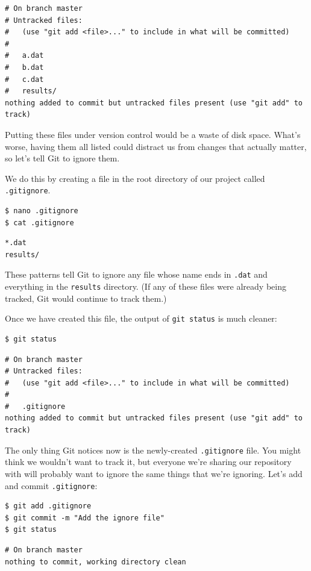 \documentclass{book}
\begin{document}
\begin{verbatim}
# On branch master
# Untracked files:
#   (use "git add <file>..." to include in what will be committed)
#
#   a.dat
#   b.dat
#   c.dat
#   results/
nothing added to commit but untracked files present (use "git add" to track)
\end{verbatim}

Putting these files under version control would be a waste of disk
space. What's worse, having them all listed could distract us from
changes that actually matter, so let's tell Git to ignore them.

We do this by creating a file in the root directory of our project
called \texttt{.gitignore}.

\begin{verbatim}
$ nano .gitignore
$ cat .gitignore
\end{verbatim}

\begin{verbatim}
*.dat
results/
\end{verbatim}

These patterns tell Git to ignore any file whose name ends in
\texttt{.dat} and everything in the \texttt{results} directory. (If any
of these files were already being tracked, Git would continue to track
them.)

Once we have created this file, the output of \texttt{git status} is
much cleaner:

\begin{verbatim}
$ git status
\end{verbatim}

\begin{verbatim}
# On branch master
# Untracked files:
#   (use "git add <file>..." to include in what will be committed)
#
#   .gitignore
nothing added to commit but untracked files present (use "git add" to track)
\end{verbatim}

The only thing Git notices now is the newly-created \texttt{.gitignore}
file. You might think we wouldn't want to track it, but everyone we're
sharing our repository with will probably want to ignore the same things
that we're ignoring. Let's add and commit \texttt{.gitignore}:

\begin{verbatim}
$ git add .gitignore
$ git commit -m "Add the ignore file"
$ git status
\end{verbatim}

\begin{verbatim}
# On branch master
nothing to commit, working directory clean
\end{verbatim}
\end{document}

